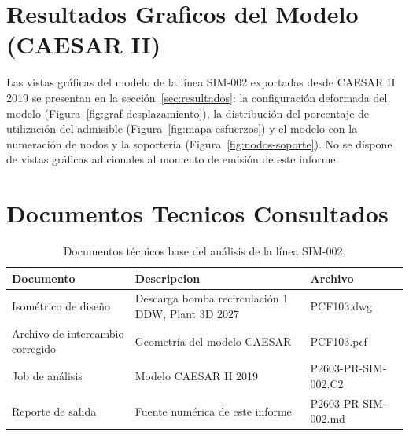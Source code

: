 \appendix
\section{Resultados Graficos del Modelo (CAESAR II)}
\label{appendix:graficos}

Las vistas gr\'{a}ficas del modelo de la l\'{i}nea SIM-002 exportadas desde
CAESAR II 2019 se presentan en la secci\'{o}n~\ref{sec:resultados}: la
configuraci\'{o}n deformada del modelo (Figura~\ref{fig:graf-desplazamiento}),
la distribuci\'{o}n del porcentaje de utilizaci\'{o}n del admisible
(Figura~\ref{fig:mapa-esfuerzos}) y el modelo con la numeraci\'{o}n de nodos y
la soporter\'{i}a (Figura~\ref{fig:nodos-soporte}). No se dispone de vistas
gr\'{a}ficas adicionales al momento de emisi\'{o}n de este informe.

\section{Documentos Tecnicos Consultados}
\label{appendix:documentos}

\begin{table}[htbp]
    \centering
    \footnotesize
    \caption{Documentos t\'{e}cnicos base del an\'{a}lisis de la l\'{i}nea SIM-002.}
    \label{tab:planos}
    \begin{tabular}{@{}lll@{}}
        \toprule
        \textbf{Documento} & \textbf{Descripcion} & \textbf{Archivo} \\
        \midrule
        Isom\'{e}trico de dise\~{n}o & Descarga bomba recirculaci\'{o}n 1 DDW, Plant 3D 2027 & PCF103.dwg \\
        Archivo de intercambio corregido & Geometr\'{i}a del modelo CAESAR & PCF103.pcf \\
        Job de an\'{a}lisis & Modelo CAESAR II 2019 & P2603-PR-SIM-002.C2 \\
        Reporte de salida & Fuente num\'{e}rica de este informe & P2603-PR-SIM-002.md \\
        \bottomrule
    \end{tabular}
\end{table}
